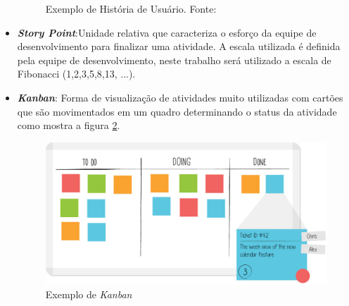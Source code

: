 \begin{itemize}
\begin{figure}[h]
\caption{Exemplo de História de Usuário. Fonte: \cite{sabbagh_scrum:_2014}}
\label{img:us}
\end{figure}
\item \textit{\textbf{Story Point}}:Unidade relativa que caracteriza o esforço da equipe de desenvolvimento para finalizar uma atividade. A escala utilizada é definida pela equipe de desenvolvimento, neste trabalho será utilizado a escala de Fibonacci (1,2,3,5,8,13, ...). 
\item \textit{\textbf{Kanban}}: Forma de visualização de atividades muito utilizadas com cartões que são movimentados em um quadro determinando o status da atividade como mostra a figura \ref{img:kanban}.
\graphicspath{{figuras/}}
\begin{figure}[h]
\centering
\includegraphics[scale=0.40]{kanban}
\caption{Exemplo de \textit{Kanban}}
\label{img:kanban}
\end{figure}

\end{itemize}
